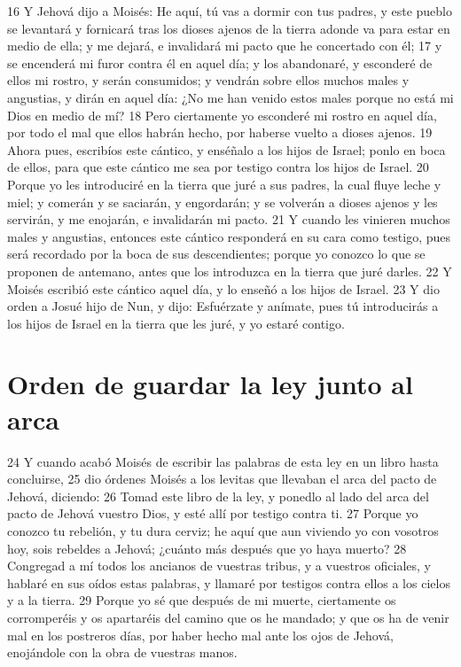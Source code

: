 16 Y Jehová dijo a Moisés: He aquí, tú vas a dormir con tus padres, y este pueblo se levantará y fornicará tras los dioses ajenos de la tierra adonde va para estar en medio de ella; y me dejará, e invalidará mi pacto que he concertado con él;
17 y se encenderá mi furor contra él en aquel día; y los abandonaré, y esconderé de ellos mi rostro, y serán consumidos; y vendrán sobre ellos muchos males y angustias, y dirán en aquel día: ¿No me han venido estos males porque no está mi Dios en medio de mí?
18 Pero ciertamente yo esconderé mi rostro en aquel día, por todo el mal que ellos habrán hecho, por haberse vuelto a dioses ajenos.
19 Ahora pues, escribíos este cántico, y enséñalo a los hijos de Israel; ponlo en boca de ellos, para que este cántico me sea por testigo contra los hijos de Israel.
20 Porque yo les introduciré en la tierra que juré a sus padres, la cual fluye leche y miel; y comerán y se saciarán, y engordarán; y se volverán a dioses ajenos y les servirán, y me enojarán, e invalidarán mi pacto.
21 Y cuando les vinieren muchos males y angustias, entonces este cántico responderá en su cara como testigo, pues será recordado por la boca de sus descendientes; porque yo conozco lo que se proponen de antemano, antes que los introduzca en la tierra que juré darles.
22 Y Moisés escribió este cántico aquel día, y lo enseñó a los hijos de Israel.
23 Y dio orden a Josué hijo de Nun, y dijo: Esfuérzate y anímate, pues tú introducirás a los hijos de Israel en la tierra que les juré, y yo estaré contigo.

\section{Orden de guardar la ley junto al arca}

24 Y cuando acabó Moisés de escribir las palabras de esta ley en un libro hasta concluirse,
25 dio órdenes Moisés a los levitas que llevaban el arca del pacto de Jehová, diciendo:
26 Tomad este libro de la ley, y ponedlo al lado del arca del pacto de Jehová vuestro Dios, y esté allí por testigo contra ti.
27 Porque yo conozco tu rebelión, y tu dura cerviz; he aquí que aun viviendo yo con vosotros hoy, sois rebeldes a Jehová; ¿cuánto más después que yo haya muerto?
28 Congregad a mí todos los ancianos de vuestras tribus, y a vuestros oficiales, y hablaré en sus oídos estas palabras, y llamaré por testigos contra ellos a los cielos y a la tierra.
29 Porque yo sé que después de mi muerte, ciertamente os corromperéis y os apartaréis del camino que os he mandado; y que os ha de venir mal en los postreros días, por haber hecho mal ante los ojos de Jehová, enojándole con la obra de vuestras manos.

